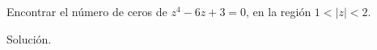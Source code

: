 \begin{homeworkProblem}
  Encontrar el número de ceros de $z^4-6z+3=0$, en la región $1<|z|<2$.
  \begin{solution}
    Solución. 
  \end{solution}
\end{homeworkProblem}
